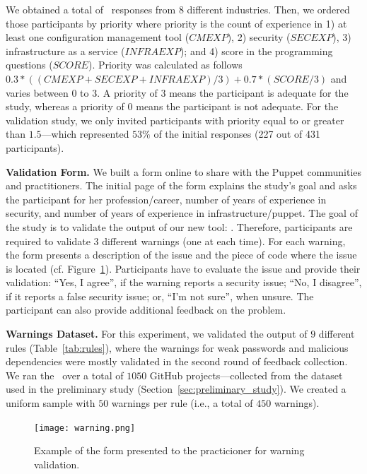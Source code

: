 We obtained a total of \noProfessionalsProlificRaw\ responses 
from $8$ different industries. Then, we ordered those participants by priority
where priority is the count of experience in 1) at least one configuration management tool ($CMEXP$), 
2) security ($SECEXP$), 3) infrastructure as a service ($INFRAEXP$); and 4) score in the programming 
questions ($SCORE$). 
Priority was calculated as follows $0.3 * ((CMEXP + SECEXP + INFRAEXP)/3) + 0.7 * (SCORE/3)$
and varies between $0$ to $3$. A priority of 
$3$ means the participant is adequate for the study, whereas a priority of $0$ means the participant 
is not adequate. For the validation study, we only invited  
participants with priority equal to or greater than $1.5$---which represented $53\%$ of the
initial responses (227 out of 431 participants).


\textbf{Validation Form.} We built a form online to share with the Puppet communities 
and practitioners. The initial page of the form explains the study's goal and asks 
the participant for her profession/career, number of years of experience in security, and number of years of experience in infrastructure/puppet. 
The goal of the study is to validate the output of our new tool: \toolname. 
Therefore, participants are required to validate $3$ different warnings (one at each time). For each warning, 
the form presents a description of the issue and the piece of code where the issue is located (cf. Figure~\ref{fig:warning}). 
Participants have to evaluate the issue and provide their validation:
``Yes, I agree'', if the warning reports a security issue; ``No, I disagree'',
if it reports a false security issue; or, ``I'm not sure'', when unsure.
The participant can also provide additional feedback on the problem.

\textbf{Warnings Dataset.}
For this experiment, we validated the output of $9$ different rules (Table~\ref{tab:rules}), where 
the warnings for weak passwords and malicious dependencies were mostly validated in 
the second round of feedback collection. We ran the \toolname\
over a total of $1050$ GitHub projects---collected from the dataset 
used in the preliminary study (Section~\ref{sec:preliminary_study}). We created
a uniform sample with $50$ warnings per rule (i.e., a total of $450$ warnings).

\begin{figure}[t!]
    \centering
    \texttt{[image: warning.png]}
    \vspace{-3ex}
    \caption{Example of the form presented to the 
    practicioner for warning validation.}\label{fig:warning}
    \vspace{-3ex}
\end{figure}

